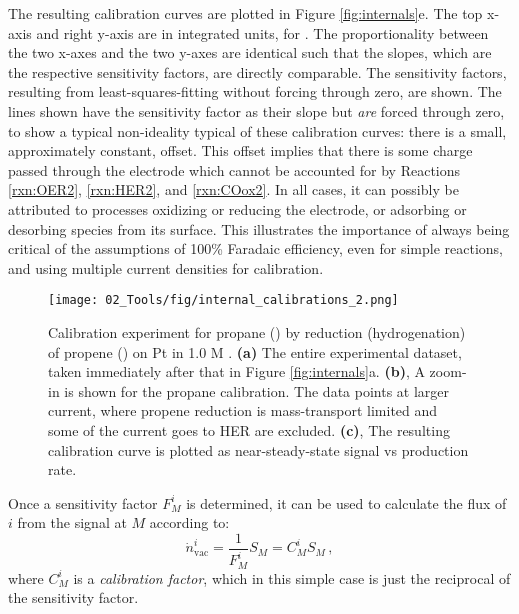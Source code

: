The resulting calibration curves are plotted in Figure \ref{fig:internals}e. The top x-axis and right y-axis are in integrated units, for . The proportionality between the two x-axes and the two y-axes are identical such that the slopes, which are the respective sensitivity factors, are directly comparable. The sensitivity factors, resulting from least-squares-fitting without forcing through zero, are shown. The lines shown have the sensitivity factor as their slope but \textit{are} forced through zero, to show a typical non-ideality typical of these calibration curves: there is a small, approximately constant, offset. This offset implies that there is some charge passed through the electrode which cannot be accounted for by Reactions \ref{rxn:OER2}, \ref{rxn:HER2}, and \ref{rxn:COox2}. In all cases, it can possibly be attributed to processes oxidizing or reducing the electrode, or adsorbing or desorbing species from its surface. This illustrates the importance of always being critical of the assumptions of 100\% Faradaic efficiency, even for simple reactions, and using multiple current densities for calibration.
\begin{figure}[h!]
	\texttt{[image: 02\_Tools/fig/internal\_calibrations\_2.png]}
	\caption{Calibration experiment for propane () by reduction (hydrogenation) of propene () on Pt in 1.0 M . \textbf{(a)} The entire experimental dataset, taken immediately after that in Figure \ref{fig:internals}a. \textbf{(b)}, A zoom-in is shown for the propane calibration. The data points at larger current, where propene reduction is mass-transport limited and some of the current goes to HER are excluded. \textbf{(c)}, The resulting calibration curve is plotted as near-steady-state signal vs production rate.
	}
	\label{fig:internals_2}
\end{figure}
Once a sensitivity factor $F_M^i$ is determined, it can be used to calculate the flux of $i$ from the signal at $M$ according to:
\begin{equation}
\dot{n}^i_{\text{vac}} = \frac{1}{F_M^i} S_M = C_M^i S_M\,,
\end{equation}
where $C_M^i$ is a \textit{calibration factor}, which in this simple case is just the reciprocal of the sensitivity factor.


